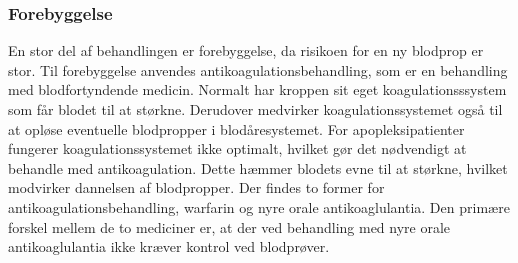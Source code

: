 \subsubsection{Forebyggelse}
En stor del af behandlingen er forebyggelse, da risikoen for en ny blodprop er stor. Til forebyggelse anvendes antikoagulationsbehandling, som er en behandling med blodfortyndende medicin. Normalt har kroppen sit eget koagulationsssystem som får blodet til at størkne. Derudover medvirker koagulationssystemet også til at opløse eventuelle blodpropper i blodåresystemet. For apopleksipatienter fungerer koagulationssystemet ikke optimalt, hvilket gør det nødvendigt at behandle med antikoagulation. Dette hæmmer blodets evne til at størkne, hvilket modvirker dannelsen af blodpropper. Der findes to former for antikoagulationsbehandling, warfarin og nyre orale antikoaglulantia. Den primære forskel mellem de to mediciner er, at der ved behandling med nyre orale antikoaglulantia ikke kræver kontrol ved blodprøver.\cite{Kjaergaard2015}

